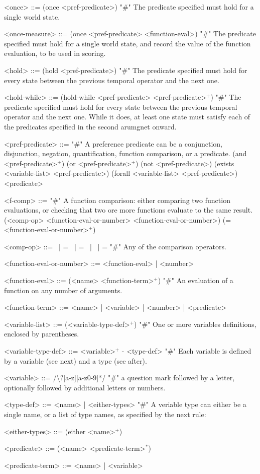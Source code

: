 \documentclass{article}
\begin{document}
\begin{grammar}
<once> ::= (once <pref-predicate>) "#" The predicate specified must hold for a single world state.

<once-measure> ::= (once <pref-predicate> <function-eval>) "#" The predicate specified must hold for a single world state, and record the value of the function evaluation, to be used in scoring.

<hold> ::= (hold <pref-predicate>) "#" The predicate specified must hold for every state between the previous temporal operator and the next one.

<hold-while> ::= (hold-while <pref-predicate> <pref-predicate>$^+$) "#" The predicate specified must hold for every state between the previous temporal operator and the next one. While it does, at least one state must satisfy each of the predicates specified in the second arumgnet onward.

<pref-predicate> ::= "#" A preference predicate can be a conjunction, disjunction, negation, quantification, function comparison, or a predicate.
    \alt (and <pref-predicate>$^+$)
    \alt (or <pref-predicate>$^+$)
    \alt (not <pref-predicate>)
    \alt (exists <variable-list> <pref-predicate>) 
    \alt (forall <variable-list> <pref-predicate>)
    \alt <predicate>


<f-comp> ::= "#" A function comparison: either comparing two function evaluations, or checking that two ore more functions evaluate to the same result.
    \alt (<comp-op> <function-eval-or-number> <function-eval-or-number>) 
    \alt (= <function-eval-or-number>$^+$)
    
<comp-op> ::=  \textlangle \ | \textlangle = \ | = \ | \textrangle \ | \textrangle = "#" Any of the comparison operators.

<function-eval-or-number> ::= <function-eval> | <number> 

<function-eval> ::= (<name> <function-term>$^+$) "#" An evaluation of a function on any number of arguments.

<function-term> ::= <name> | <variable> | <number> | <predicate>

<variable-list> ::= (<variable-type-def>$^+$) "#" One or more variables definitions, enclosed by parentheses.

<variable-type-def> ::= <variable>$^+$ - <type-def> "#" Each variable is defined by a variable (see next) and a type (see after).

<variable> ::= /\textbackslash?[a-z][a-z0-9]*/  "#" a question mark followed by a letter, optionally followed by additional letters or numbers.

<type-def> ::= <name> | <either-types> "#" A veriable type can either be a single name, or a list of type names, as specified by the next rule:

<either-types> ::= (either <name>$^+$)

<predicate> ::= (<name> <predicate-term>$^*$)

<predicate-term> ::= <name> | <variable>


\end{grammar}
\end{document}

